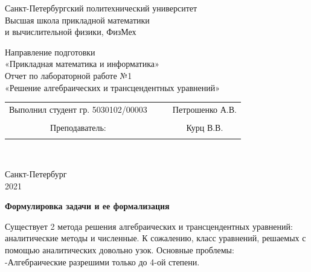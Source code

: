 \documentclass{article}
\begin{document}
	\begin{center}
		\hfill \break
		\begin{center}
			\huge{Санкт-Петербургский политехнический университет\\
				Высшая школа прикладной математики\\
				и вычислительной физики, ФизМех}
		\end{center}
		\hfill \break
		\hfill \break
		\hfill \break
		\hfill \break
		\hfill \break
		\huge{Направление подготовки\\
			«Прикладная математика и информатика»}\\
		\hfill \break
		\hfill \break
		\hfill \break
		\hfill \break
		\hfill \break
		\hfill \break
		\fontsize{14pt}{14pt}\selectfont
		Отчет по лабораторной работе №1\\
		«Решение алгебраических и трансцендентных уравнений»\\
		\hfill \break
		\hfill \break
		\hfill \break
		\hfill \break
		\hfill \break
	\end{center}
	\hfill \break
	\hfill \break
	\fontsize{12pt}{12pt}\selectfont
	\begin{tabular}{cccc}
		\hspace{1cm}Выполнил студент гр. 5030102/00003 & {\hspace{3cm}} & & Петрошенко А.В. \\\\
		\hspace{-3cm}Преподаватель: &{\hspace{1cm}}& & {\hspace{1cm}} Курц В.В. \\\\
	\end{tabular}\\
	\hfill \break
	\hfill \break
	\hfill \break
	\hfill \break
	\hfill \break
	\hfill \break
	\begin{center} Санкт-Петербург\\ 
	2021\\
	\end{center}
	\thispagestyle{empty}
	\newpage
	\begin{center} \textbf{Формулировка задачи и ее формализация}\end{center}
	Существует 2 метода решения алгебраических и трансцендентных уравнений: аналитические методы и численные. К сожалению, класс уравнений, решаемых с помощью аналитических довольно узок. Основные проблемы:\\
	-Алгебраические разрешими только до 4-ой степени.\\
\end{document}
